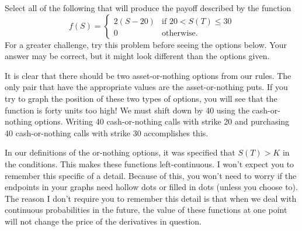 \documentclass{ximera}
\begin{document}
\begin{question}
Select all of the following that will produce the payoff described by the function
	\begin{equation*}
	f(S)=
		\begin{cases}
		2(S-20) & \text{if } 20<S(T)\leq 30\\
		0 & \text{otherwise.}
		\end{cases}
	\end{equation*}
For a greater challenge, try this problem before seeing the options below. Your answer may be correct, but it might look different than the options given.
	\begin{selectAll}
	\end{selectAll}
\end{question}

\begin{solution}
It is clear that there should be two asset-or-nothing options from our rules. The only pair that have the appropriate values are the asset-or-nothing puts. If you try to graph the position of these two types of options, you will see that the function is forty units too high! We must shift down by 40 using the cash-or-nothing options. Writing 40 cash-or-nothing calls with strike 20 and purchasing 40 cash-or-nothing calls with strike 30 accomplishes this.
\end{solution}

\begin{remark}
In our definitions of the or-nothing options, it was specified that $S(T)>K$ in the conditions. This makes these functions left-continuous. I won't expect you to remember this specific of a detail. Because of this, you won't need to worry if the endpoints in your graphs need hollow dots or filled in dots (unless you choose to). The reason I don't require you to remember this detail is that when we deal with continuous probabilities in the future, the value of these functions at one point will not change the price of the derivatives in question.
\end{remark}
\end{document}
